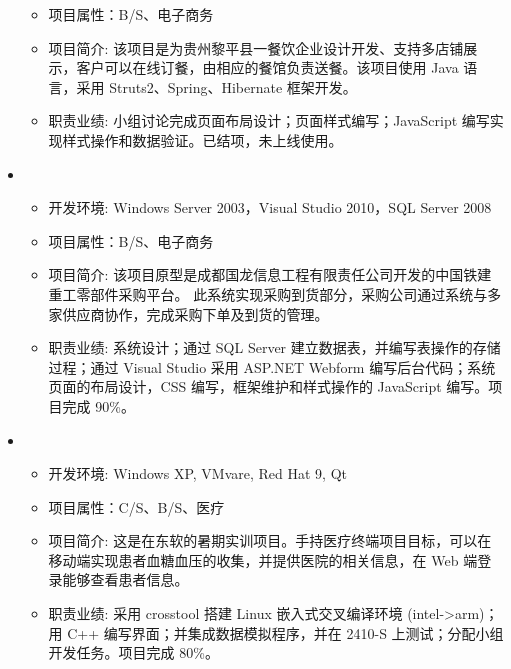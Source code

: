 \begin{itemize}[leftmargin=*]
{\begin{itemize}
      \item 项目属性：B/S、电子商务
      \item 项目简介: 该项目是为贵州黎平县一餐饮企业设计开发、支持多店铺展示，客户可以在线订餐，由相应的餐馆负责送餐。该项目使用 Java 语言，采用 Struts2、Spring、Hibernate 框架开发。
      \item 职责业绩: 小组讨论完成页面布局设计；页面样式编写；JavaScript 编写实现样式操作和数据验证。已结项，未上线使用。
    \end{itemize}
    }
    \item
    {\small
    \begin{itemize}
      \item 开发环境: Windows Server 2003，Visual Studio 2010，SQL Server 2008
      \item 项目属性：B/S、电子商务
      \item 项目简介: 该项目原型是成都国龙信息工程有限责任公司开发的中国铁建重工零部件采购平台。 此系统实现采购到货部分，采购公司通过系统与多家供应商协作，完成采购下单及到货的管理。
      \item 职责业绩: 系统设计；通过 SQL Server 建立数据表，并编写表操作的存储过程；通过 Visual Studio 采用 ASP.NET Webform 编写后台代码；系统页面的布局设计，CSS 编写，框架维护和样式操作的 JavaScript 编写。项目完成 90\%。
    \end{itemize}
    }
    \item {}
    {\small
    \begin{itemize}
      \item 开发环境: Windows XP, VMvare, Red Hat 9, Qt
      \item 项目属性：C/S、B/S、医疗
      \item 项目简介: 这是在东软的暑期实训项目。手持医疗终端项目目标，可以在移动端实现患者血糖血压的收集，并提供医院的相关信息，在 Web 端登录能够查看患者信息。
      \item 职责业绩: 采用 crosstool 搭建 Linux 嵌入式交叉编译环境 (intel->arm)；用 C++ 编写界面；并集成数据模拟程序，并在 2410-S 上测试；分配小组开发任务。项目完成 80\%。
    \end{itemize}
    }
  \end{itemize}